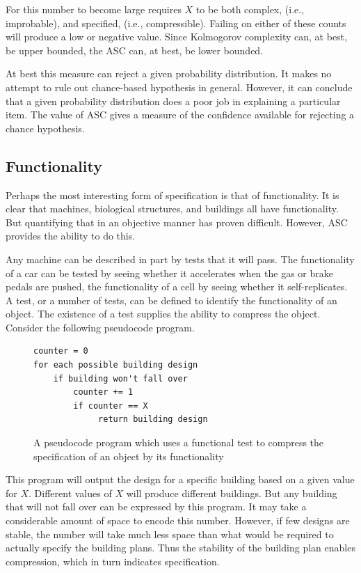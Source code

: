 For this number to become large requires $X$ to be both complex, (i.e., improbable), and specified, (i.e., compressible).
Failing on either of these counts will produce a low or negative value.
Since Kolmogorov complexity can, at best, be upper bounded, the ASC can, at best, be lower bounded.

At best this measure can reject a given probability distribution.
It makes no attempt to rule out chance-based hypothesis in general.
However, it can conclude that a given probability distribution does a poor job in explaining a particular item.
The value of ASC gives a measure of the confidence available for rejecting a chance hypothesis.

\subsection{Functionality}

Perhaps the most interesting form of specification is that of functionality.
It is clear that machines, biological structures, and buildings all have functionality.
But quantifying that in an objective manner has proven difficult.
However, ASC provides the ability to do this.

Any machine can be described in part by tests that it will pass.
The functionality of a car can be tested by seeing whether it accelerates when the gas or brake pedals are pushed,
the functionality of a cell by seeing whether it self-replicates.
A test, or a number of tests, can be defined to identify the functionality of an object. 
The existence of a test supplies the ability to compress the object.
Consider the following pseudocode program.

\begin{figure}[H]
\begin{mdframed}
\begin{verbatim}
counter = 0
for each possible building design
    if building won't fall over
        counter += 1
        if counter == X
             return building design
\end{verbatim} 
\end{mdframed}
\caption{A pseudocode program which uses a functional test to compress the specification of an object by its functionality}
\end{figure}
This program will output the design for a specific building based on a given value for $X$.
Different values of $X$ will produce different buildings.
But any building that will not fall over can be expressed by this program.
It may take a considerable amount of space to encode this number.
However, if few designs are stable, the number will take much less space than what would be required to actually specify the building plans.
Thus the stability of the building plan enables compression, which in turn indicates specification.


